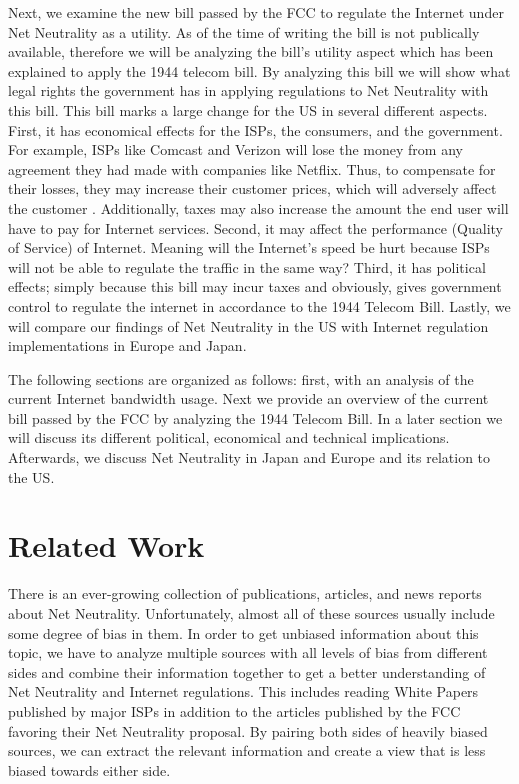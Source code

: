 \documentclass{sigcomm-alternate}
\begin{document}
Next, we examine the new bill passed by the FCC to regulate the Internet under Net Neutrality as a utility. As of the time of writing the bill is not publically available, therefore we will be analyzing the bill’s utility aspect which has been explained to apply the 1944 telecom bill.  By analyzing this bill we will show what legal rights the government has in applying regulations to Net Neutrality with this bill. This bill marks a large change for the US in several different aspects. First, it has economical effects for the ISPs, the consumers, and the government. For example, ISPs like Comcast and Verizon will lose the money from any agreement they had made with companies like Netflix.  Thus, to compensate for their losses, they may increase their customer prices, which will adversely affect the customer \cite{inthenews}. Additionally, taxes may also increase the amount the end user will have to pay for Internet services. Second, it may affect the performance (Quality of Service) of Internet. Meaning will the Internet’s speed be hurt because ISPs will not be able to regulate the traffic in the same way? Third, it has political effects; simply because this bill may incur taxes and obviously, gives government control to regulate the internet in accordance to the 1944 Telecom Bill. Lastly, we will compare our findings of Net Neutrality in the US with Internet regulation implementations in Europe and Japan.

The following sections are organized as follows: first, with an analysis of the current Internet bandwidth usage. Next we provide an overview of the current bill passed by the FCC by analyzing the 1944 Telecom Bill. In a later section we will discuss its different political, economical and technical implications. Afterwards, we discuss Net Neutrality in Japan and Europe and its relation to the US.


\section{Related Work}
There is an ever-growing collection of publications, articles, and news reports about Net Neutrality. Unfortunately, almost all of these sources usually include some degree of bias in them. In order to get unbiased information about this topic, we have to analyze multiple sources with all levels of bias from different sides and combine their information together to get a better understanding of Net Neutrality and Internet regulations. This includes reading White Papers published by major ISPs in addition to the articles published by the FCC favoring their Net Neutrality proposal. By pairing both sides of heavily biased sources, we can extract the relevant information and create a view that is less biased towards either side. 
\end{document}
